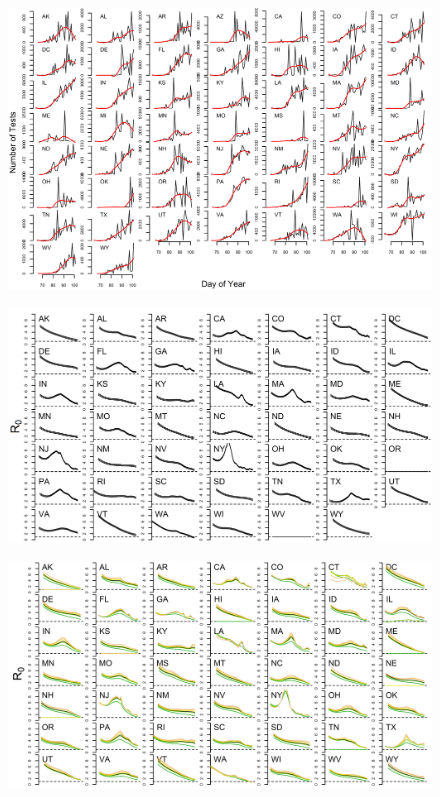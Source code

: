 \documentclass[11pt]{article}
\begin{document}
\begin{figure}
\centering
\hspace*{0cm}\includegraphics[width=16cm]{number_of_tests_span06.png}
\caption{}
\label{fig:bends}
\end{figure} 


\begin{figure}
\centering
\hspace*{0cm}\includegraphics[width=18cm]{beta_AR1_fits_R0.png}
\caption{}
\label{fig:bends}
\end{figure} 
\begin{figure}


\centering
\hspace*{0cm}\includegraphics[width=18cm]{beta_AR1_fits_R0_ps_sensitivity.png}
\caption{}
\label{fig:bends}
\end{figure} 
\end{document}
